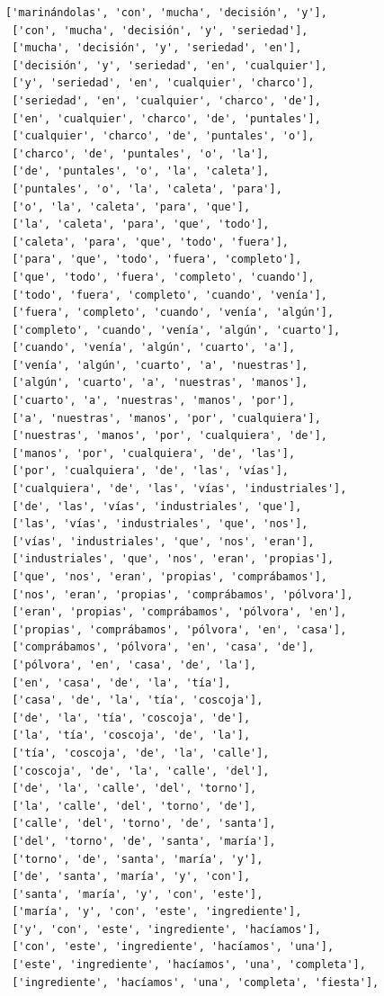 \documentclass[11pt]{article}
\begin{document}
\begin{tcolorbox}[breakable, size=fbox, boxrule=1pt, pad at break*=1mm,colback=cellbackground, colframe=cellborder]
\begin{Verbatim}[commandchars=\\\{\}]
 ['marinándolas', 'con', 'mucha', 'decisión', 'y'],
 ['con', 'mucha', 'decisión', 'y', 'seriedad'],
 ['mucha', 'decisión', 'y', 'seriedad', 'en'],
 ['decisión', 'y', 'seriedad', 'en', 'cualquier'],
 ['y', 'seriedad', 'en', 'cualquier', 'charco'],
 ['seriedad', 'en', 'cualquier', 'charco', 'de'],
 ['en', 'cualquier', 'charco', 'de', 'puntales'],
 ['cualquier', 'charco', 'de', 'puntales', 'o'],
 ['charco', 'de', 'puntales', 'o', 'la'],
 ['de', 'puntales', 'o', 'la', 'caleta'],
 ['puntales', 'o', 'la', 'caleta', 'para'],
 ['o', 'la', 'caleta', 'para', 'que'],
 ['la', 'caleta', 'para', 'que', 'todo'],
 ['caleta', 'para', 'que', 'todo', 'fuera'],
 ['para', 'que', 'todo', 'fuera', 'completo'],
 ['que', 'todo', 'fuera', 'completo', 'cuando'],
 ['todo', 'fuera', 'completo', 'cuando', 'venía'],
 ['fuera', 'completo', 'cuando', 'venía', 'algún'],
 ['completo', 'cuando', 'venía', 'algún', 'cuarto'],
 ['cuando', 'venía', 'algún', 'cuarto', 'a'],
 ['venía', 'algún', 'cuarto', 'a', 'nuestras'],
 ['algún', 'cuarto', 'a', 'nuestras', 'manos'],
 ['cuarto', 'a', 'nuestras', 'manos', 'por'],
 ['a', 'nuestras', 'manos', 'por', 'cualquiera'],
 ['nuestras', 'manos', 'por', 'cualquiera', 'de'],
 ['manos', 'por', 'cualquiera', 'de', 'las'],
 ['por', 'cualquiera', 'de', 'las', 'vías'],
 ['cualquiera', 'de', 'las', 'vías', 'industriales'],
 ['de', 'las', 'vías', 'industriales', 'que'],
 ['las', 'vías', 'industriales', 'que', 'nos'],
 ['vías', 'industriales', 'que', 'nos', 'eran'],
 ['industriales', 'que', 'nos', 'eran', 'propias'],
 ['que', 'nos', 'eran', 'propias', 'comprábamos'],
 ['nos', 'eran', 'propias', 'comprábamos', 'pólvora'],
 ['eran', 'propias', 'comprábamos', 'pólvora', 'en'],
 ['propias', 'comprábamos', 'pólvora', 'en', 'casa'],
 ['comprábamos', 'pólvora', 'en', 'casa', 'de'],
 ['pólvora', 'en', 'casa', 'de', 'la'],
 ['en', 'casa', 'de', 'la', 'tía'],
 ['casa', 'de', 'la', 'tía', 'coscoja'],
 ['de', 'la', 'tía', 'coscoja', 'de'],
 ['la', 'tía', 'coscoja', 'de', 'la'],
 ['tía', 'coscoja', 'de', 'la', 'calle'],
 ['coscoja', 'de', 'la', 'calle', 'del'],
 ['de', 'la', 'calle', 'del', 'torno'],
 ['la', 'calle', 'del', 'torno', 'de'],
 ['calle', 'del', 'torno', 'de', 'santa'],
 ['del', 'torno', 'de', 'santa', 'maría'],
 ['torno', 'de', 'santa', 'maría', 'y'],
 ['de', 'santa', 'maría', 'y', 'con'],
 ['santa', 'maría', 'y', 'con', 'este'],
 ['maría', 'y', 'con', 'este', 'ingrediente'],
 ['y', 'con', 'este', 'ingrediente', 'hacíamos'],
 ['con', 'este', 'ingrediente', 'hacíamos', 'una'],
 ['este', 'ingrediente', 'hacíamos', 'una', 'completa'],
 ['ingrediente', 'hacíamos', 'una', 'completa', 'fiesta'],

\end{Verbatim}
\end{tcolorbox}
\end{document}
